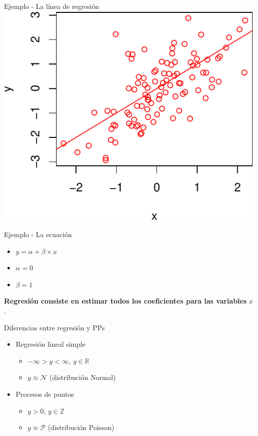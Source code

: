 \documentclass[
  11pt,
  ignorenonframetext,
]{beamer}
\providecommand{\tightlist}{%
  \setlength{\itemsep}{0pt}\setlength{\parskip}{0pt}}
\begin{document}
\begin{frame}{Ejemplo - La línea de regresión}
\protect\hypertarget{ejemplo---la-luxednea-de-regresiuxf3n}{}
\includegraphics{Generalidades_files/figure-beamer/unnamed-chunk-4-1.pdf}
\end{frame}

\begin{frame}{Ejemplo - La ecuación}
\protect\hypertarget{ejemplo---la-ecuaciuxf3n}{}
\begin{itemize}
\item
  \(y = \alpha + \beta \times x\)
\item
  \(\alpha = 0\)
\item
  \(\beta = 1\)
\end{itemize}

\textbf{Regresión consiste en estimar todos los coeficientes para las
variables} \(x\).
\end{frame}

\begin{frame}{Diferencias entre regresión y PPs}
\protect\hypertarget{diferencias-entre-regresiuxf3n-y-pps}{}
\begin{itemize}
\item
  Regresión lineal simple

  \begin{itemize}
  \tightlist
  \item
    \(-\infty > y < \infty\), \(y \in \mathbb{R}\)
  \item
    \(y \approx \mathcal{N}\) (distribución Normal)
  \end{itemize}
\item
  Procesos de puntos

  \begin{itemize}
  \tightlist
  \item
    \(y > 0\), \(y \in \mathbb{Z}\)
  \item
    \(y \approx \mathcal{P}\) (distribución Poisson)
  \end{itemize}
\end{itemize}
\end{frame}
\end{document}
